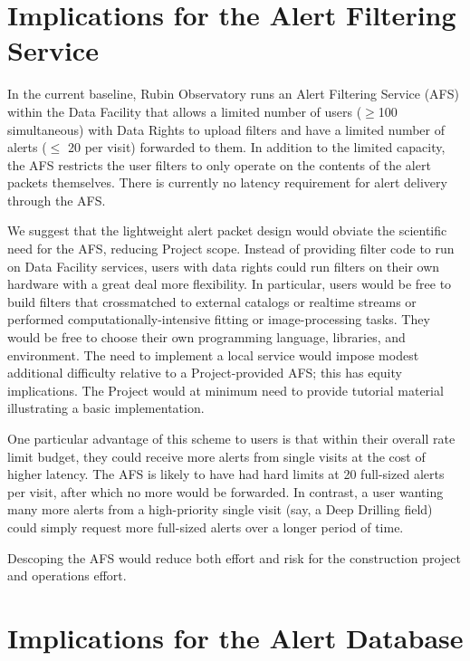 \documentclass[DM,authoryear,toc]{lsstdoc}
\begin{document}
\section{Implications for the Alert Filtering Service} \label{sec:alertfiltering}

In the current baseline, Rubin Observatory runs an Alert Filtering Service (AFS) within the Data Facility that allows a limited number of users ($\geq$100 simultaneous) with Data Rights to upload filters and have a limited number of alerts ($\leq$ 20 per visit) forwarded to them.
In addition to the limited capacity, the AFS restricts the user filters to only operate on the contents of the alert packets themselves.
There is currently no latency requirement for alert delivery through the AFS.

We suggest that the lightweight alert packet design would obviate the scientific need for the AFS, reducing Project scope.
Instead of providing filter code to run on Data Facility services, users with data rights could run filters on their own hardware with a great deal more flexibility.
In particular, users would be free to build filters that crossmatched to external catalogs or realtime streams or performed computationally-intensive fitting or image-processing tasks.
They would be free to choose their own programming language, libraries, and environment.
The need to implement a local service would impose modest additional difficulty relative to a Project-provided AFS; this has equity implications.
The Project would at minimum need to provide tutorial material illustrating a basic implementation.


One particular advantage of this scheme to users is that within their overall rate limit budget, they could receive more alerts from single visits at the cost of higher latency.
The AFS is likely to have had hard limits at 20 full-sized alerts per visit, after which no more would be forwarded.
In contrast, a user wanting many more alerts from a high-priority single visit (say, a Deep Drilling field) could simply request more full-sized alerts over a longer period of time.

Descoping the AFS would reduce both effort and risk for the construction project and operations effort.

\section{Implications for the Alert Database} \label{sec:alertdb}
\end{document}
